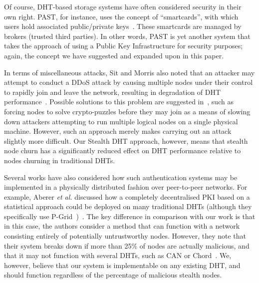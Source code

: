 \documentclass[pdftex,conference,10pt]{IEEEtran}
\begin{document}
Of course, DHT-based storage systems have often considered security in
their own right. PAST, for instance, uses the concept of
``smartcards'', with which users hold associated public/private
keys~\cite{Druschel01PAST}. These smartcards are managed by brokers
(trusted third parties). In other words, PAST is yet another system
that takes the approach of using a Public Key Infrastructure for
security purposes; again, the concept we have suggested and expanded
upon in this paper.

In terms of miscellaneous attacks, Sit and Morris also noted that an
attacker may attempt to conduct a DDoS attack by causing multiple nodes
under their control to rapidly join and leave the network, resulting in
degradation of DHT
performance~\cite{Rhea04Handling}\cite{Li04Comparing}. Possible
solutions to this problem are suggested in~\cite{Castro02Secure}, such
as forcing nodes to solve crypto-puzzles before they may join as a
means of slowing down attackers attempting to run multiple logical
nodes on a single physical machine. However, such an approach merely
makes carrying out an attack slightly more difficult. Our Stealth DHT
approach, however, means that stealth node churn has a significantly
reduced effect on DHT performance relative to nodes churning in
traditional DHTs.

Several works have also considered how such authentication systems may
be implemented in a physically distributed fashion over peer-to-peer
networks. For example, Aberer \emph{et al.} discussed how a completely
decentralised PKI based on a statistical approach could be deployed on
many traditional DHTs (although they specifically use
P-Grid~\cite{Plaxton97Accessing})~\cite{Aberer04Decentralized}. The key
difference in comparison with our work is that in this case, the
authors consider a method that can function with a network consisting
entirely of potentially untrustworthy nodes. However, they note that
their system breaks down if more than 25\% of nodes are actually
malicious, and that it may not function with several DHTs, such as CAN
or Chord~\cite{Ratnasamy01Scalable}\cite{Stoica01Chord}. We, however,
believe that our system is implementable on any existing DHT, and
should function regardless of the percentage of malicious stealth
nodes.
\end{document}

